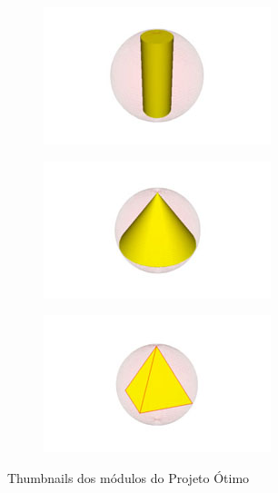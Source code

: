 \begin{figure}
    \begin{subfigure}{0.3\textwidth}
    \centering
    \includegraphics[width=.9\textwidth]{icones-modulos/pot-m-eci.jpg}
    \label{fig:eci-ic}
    \end{subfigure}
    \hfill
    \begin{subfigure}{0.3\textwidth}
    \centering
    \includegraphics[width=.9\textwidth]{icones-modulos/pot-m-eco.jpg}
    \label{fig:eco-ic}
    \end{subfigure}
    \hfill
    \begin{subfigure}{0.3\textwidth}
    \centering
    \includegraphics[width=.9\textwidth]{icones-modulos/pot-m-epi.jpg}
    \label{fig:epi-ic}
    \end{subfigure}
    
    \caption{Thumbnails dos módulos do Projeto Ótimo}
    \label{fig:icones-pot}
    
    
\end{figure}